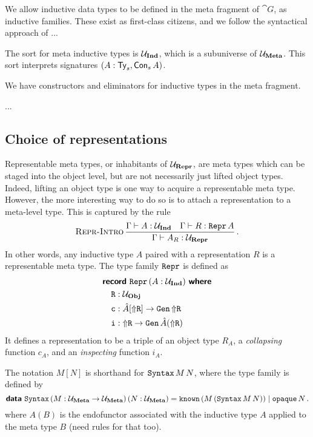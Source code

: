 We allow inductive data types to be defined in the meta fragment of $\cat{G}$,
as inductive families. These exist as first-class citizens, and we follow the
syntactical approach of \cite{Dybjer1994-zx} ...

The sort for meta inductive types is $\Ui$, which is a subuniverse of $\Um$.
This sort interprets signatures $(A : \Ty_s, \Con_s \, A)$.

We have constructors and eliminators for inductive types in the meta fragment.

...

\subsection{Choice of representations}

Representable meta types, or inhabitants of $\Ur$, are meta types which can be
staged into the object level, but are not necessarily just lifted object types.
Indeed, lifting an object type is one way to acquire a representable meta type.
However, the more interesting way to do so is to attach a representation to a
meta-level type. This is captured by the rule
\[
  \infrule[Repr-Intro]{\Gamma \vdash A : \Ui \quad \Gamma \vdash R : \defin{Repr}\,A}
  {\Gamma \vdash A_R : \Ur} \,.
\]
In other words, any inductive type $A$ paired with a representation $R$ is a
representable meta type. The type family $\Repr$ is defined as
\begin{align*}
   & \recordwhere[\,(A: \Ui)]{Repr}                                                   \\
   & \quad \defin{R} : \Uv                                                            \\
   & \quad    \defin{c} : \hat{A} [\lift{\defin R}] \to \Gen \, \lift{\defin R} \quad \\
   & \quad    \defin{i} : \lift{\defin R} \to \Gen \, \hat{A}(\lift{\defin R})
\end{align*}
It defines a representation to be a triple of an object type $R_A$, a
\emph{collapsing} function $c_A$, and an \emph{inspecting} function $i_A$.

The notation $M[N]$ is shorthand for $\defin{Syntax}\,M\,N$, where the
 type family is defined by
\[
  \data{Syntax} \,(M : \Um \to \Um)\,(N : \Um) = \defin{known} \, (M\,(\defin{Syntax}\,M\,N)) \mid \defin{opaque} \, N \,.
\]
where $A(B)$ is the endofunctor associated with the inductive type $A$ applied
to the meta type $B$ (need rules for that too).

